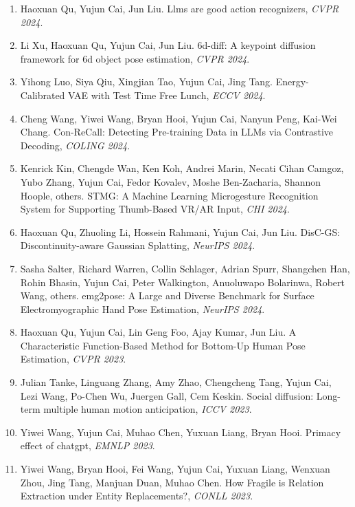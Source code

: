 \begin{enumerate}
\item Haoxuan Qu, Yujun Cai, Jun Liu. Llms are good action recognizers, \textit{CVPR 2024}.

\item Li Xu, Haoxuan Qu, Yujun Cai, Jun Liu. 6d-diff: A keypoint diffusion framework for 6d object pose estimation, \textit{CVPR 2024}.

\item Yihong Luo, Siya Qiu, Xingjian Tao, Yujun Cai, Jing Tang. Energy-Calibrated VAE with Test Time Free Lunch, \textit{ECCV 2024}.

\item Cheng Wang, Yiwei Wang, Bryan Hooi, Yujun Cai, Nanyun Peng, Kai-Wei Chang. Con-ReCall: Detecting Pre-training Data in LLMs via Contrastive Decoding, \textit{COLING 2024}.

\item Kenrick Kin, Chengde Wan, Ken Koh, Andrei Marin, Necati Cihan Camgoz, Yubo Zhang, Yujun Cai, Fedor Kovalev, Moshe Ben-Zacharia, Shannon Hoople, others. STMG: A Machine Learning Microgesture Recognition System for Supporting Thumb-Based VR/AR Input, \textit{CHI 2024}.

\item Haoxuan Qu, Zhuoling Li, Hossein Rahmani, Yujun Cai, Jun Liu. DisC-GS: Discontinuity-aware Gaussian Splatting, \textit{NeurIPS 2024}.

\item Sasha Salter, Richard Warren, Collin Schlager, Adrian Spurr, Shangchen Han, Rohin Bhasin, Yujun Cai, Peter Walkington, Anuoluwapo Bolarinwa, Robert Wang, others. emg2pose: A Large and Diverse Benchmark for Surface Electromyographic Hand Pose Estimation, \textit{NeurIPS 2024}.

\item Haoxuan Qu, Yujun Cai, Lin Geng Foo, Ajay Kumar, Jun Liu. A Characteristic Function-Based Method for Bottom-Up Human Pose Estimation, \textit{CVPR 2023}.

\item Julian Tanke, Linguang Zhang, Amy Zhao, Chengcheng Tang, Yujun Cai, Lezi Wang, Po-Chen Wu, Juergen Gall, Cem Keskin. Social diffusion: Long-term multiple human motion anticipation, \textit{ICCV 2023}.

\item Yiwei Wang, Yujun Cai, Muhao Chen, Yuxuan Liang, Bryan Hooi. Primacy effect of chatgpt, \textit{EMNLP 2023}.

\item Yiwei Wang, Bryan Hooi, Fei Wang, Yujun Cai, Yuxuan Liang, Wenxuan Zhou, Jing Tang, Manjuan Duan, Muhao Chen. How Fragile is Relation Extraction under Entity Replacements?, \textit{CONLL 2023}.


\end{enumerate}
